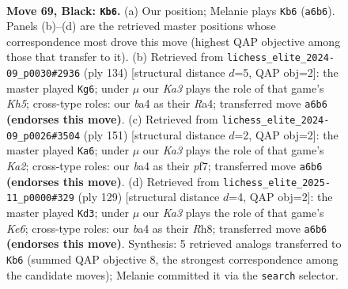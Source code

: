 \documentclass[11pt]{article}
\begin{document}
\clearpage

\begin{figure}[p]\centering
\begin{subfigure}{0.46\textwidth}\centering
\resizebox{\linewidth}{!}{%
\newchessgame
\chessboard[
  setfen={8/5R2/k7/5P2/B7/4K3/7P/8 b - - 0 69},
  showmover=false,
  pgfstyle=straightmove, color=movearrow, markmove={a6-b6}
]}
\caption{}
\end{subfigure}\hfill
\begin{subfigure}{0.46\textwidth}\centering
\resizebox{\linewidth}{!}{%
\newchessgame
\chessboard[
  setfen={8/2k5/8/5P1K/R7/6p1/8/6r1 w - - 0 68},
  showmover=false,
  pgfstyle=straightmove, color=movearrow, markmove={h5-g6}
]}
\caption{}
\end{subfigure}
\\[4pt]
\begin{subfigure}{0.46\textwidth}\centering
\resizebox{\linewidth}{!}{%
\newchessgame
\chessboard[
  setfen={7R/k4P2/2K5/8/7P/8/8/8 b - - 0 76},
  showmover=false,
  pgfstyle=straightmove, color=movearrow, markmove={a7-a6}
]}
\caption{}
\end{subfigure}\hfill
\begin{subfigure}{0.46\textwidth}\centering
\resizebox{\linewidth}{!}{%
\newchessgame
\chessboard[
  setfen={7r/8/2K5/8/PR6/4k3/8/8 b - - 0 65},
  showmover=false,
  pgfstyle=straightmove, color=movearrow, markmove={e3-d3}
]}
\caption{}
\end{subfigure}
\caption{\textbf{Move 69, Black: \texttt{Kb6}.} (a) Our position; Melanie plays \texttt{Kb6} (\texttt{a6b6}). Panels (b)--(d) are the retrieved master positions whose correspondence most drove this move (highest QAP objective among those that transfer to it). (b) Retrieved from \texttt{lichess\_elite\_2024-09\_p0030\#2936} (ply 134) [structural distance $d$=5, QAP obj=2]: the master played \texttt{Kg6}; under $\mu$ our \emph{Ka3} plays the role of that game's \emph{Kh5}; cross-type roles: our \emph{b}a4 as their \emph{R}a4; transferred move \texttt{a6b6} \textbf{(endorses this move)}. (c) Retrieved from \texttt{lichess\_elite\_2024-09\_p0026\#3504} (ply 151) [structural distance $d$=2, QAP obj=2]: the master played \texttt{Ka6}; under $\mu$ our \emph{Ka3} plays the role of that game's \emph{Ka2}; cross-type roles: our \emph{b}a4 as their \emph{p}f7; transferred move \texttt{a6b6} \textbf{(endorses this move)}. (d) Retrieved from \texttt{lichess\_elite\_2025-11\_p0000\#329} (ply 129) [structural distance $d$=4, QAP obj=2]: the master played \texttt{Kd3}; under $\mu$ our \emph{Ka3} plays the role of that game's \emph{Ke6}; cross-type roles: our \emph{b}a4 as their \emph{R}h8; transferred move \texttt{a6b6} \textbf{(endorses this move)}. Synthesis: 5 retrieved analogs transferred to \texttt{Kb6} (summed QAP objective 8, the strongest correspondence among the candidate moves); Melanie committed it via the \texttt{search} selector.}
\label{fig:thought-m137}
\end{figure}
\end{document}
